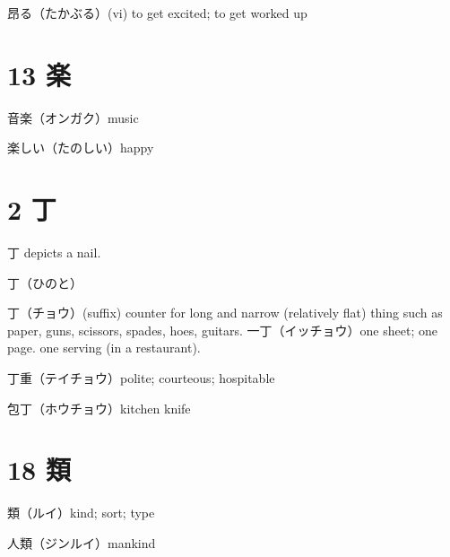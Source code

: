 昂る（たかぶる）(vi) to get excited; to get worked up

\section{13 楽}

音楽（オンガク）music

楽しい（たのしい）happy

\section{2 丁}

丁 depicts a nail.

丁（ひのと）

丁（チョウ）(suffix)
counter for long and narrow (relatively flat) thing
such as paper, guns, scissors, spades, hoes, guitars.
一丁（イッチョウ）one sheet; one page.
one serving (in a restaurant).

丁重（テイチョウ）polite; courteous; hospitable

包丁（ホウチョウ）kitchen knife

\section{18 類}

類（ルイ）kind; sort; type

人類（ジンルイ）mankind

